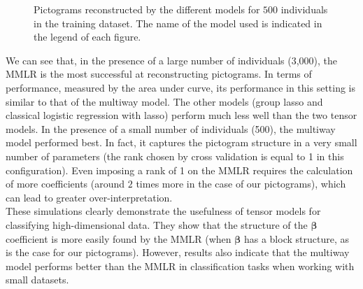 \documentclass[preprint,12pt]{elsarticle}
\begin{document}
\begin{figure}[H]
    \centering
    \caption{Pictograms reconstructed by the different models for $500$ individuals in the training dataset. The name of the model used is indicated in the legend of each figure.}
    \label{fig:tableau_figures_500}
\end{figure}
\indent We can see that, in the presence of a large number of individuals (3,000), the MMLR is the most successful at reconstructing pictograms. In terms of performance, measured by the area under curve, its performance in this setting is similar to that of the multiway model. The other models (group lasso and classical logistic regression with lasso) perform much less well than the two tensor models.
In the presence of a small number of individuals (500), the multiway model performed best. In fact, it captures the pictogram structure in a very small number of parameters (the rank chosen by cross validation is equal to 1 in this configuration). Even imposing a rank of 1 on the MMLR requires the calculation of more coefficients (around $2$ times more in the case of our pictograms), which can lead to greater over-interpretation.\\
\indent These simulations clearly demonstrate the usefulness of tensor models for classifying high-dimensional data. They show that the structure of the $\bm{\beta}$ coefficient is more easily found by the MMLR (when $\bm{\beta}$ has a block structure, as is the case for our pictograms). However, results also indicate that the multiway model performs better than the MMLR in classification tasks when working with small datasets.\\
\end{document}
